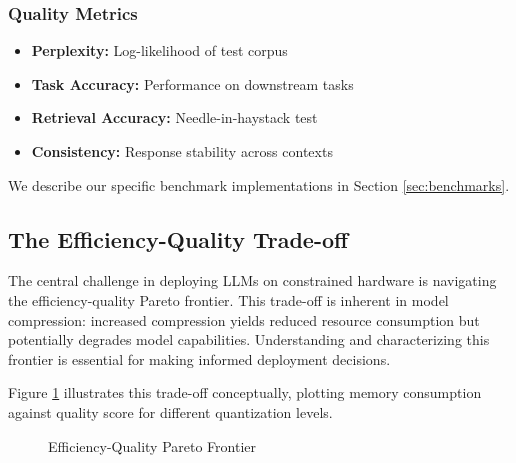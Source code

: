 \subsubsection{Quality Metrics}

\begin{itemize}
    \item \textbf{Perplexity:} Log-likelihood of test corpus
    \item \textbf{Task Accuracy:} Performance on downstream tasks
    \item \textbf{Retrieval Accuracy:} Needle-in-haystack test
    \item \textbf{Consistency:} Response stability across contexts
\end{itemize}

We describe our specific benchmark implementations in Section \ref{sec:benchmarks}.

\subsection{The Efficiency-Quality Trade-off}

The central challenge in deploying LLMs on constrained hardware is navigating the efficiency-quality Pareto frontier. This trade-off is inherent in model compression: increased compression yields reduced resource consumption but potentially degrades model capabilities. Understanding and characterizing this frontier is essential for making informed deployment decisions.

Figure \ref{fig:pareto} illustrates this trade-off conceptually, plotting memory consumption against quality score for different quantization levels.

\begin{figure}[h]
\centering
{}
\caption{Efficiency-Quality Pareto Frontier}
\label{fig:pareto}
\end{figure}

